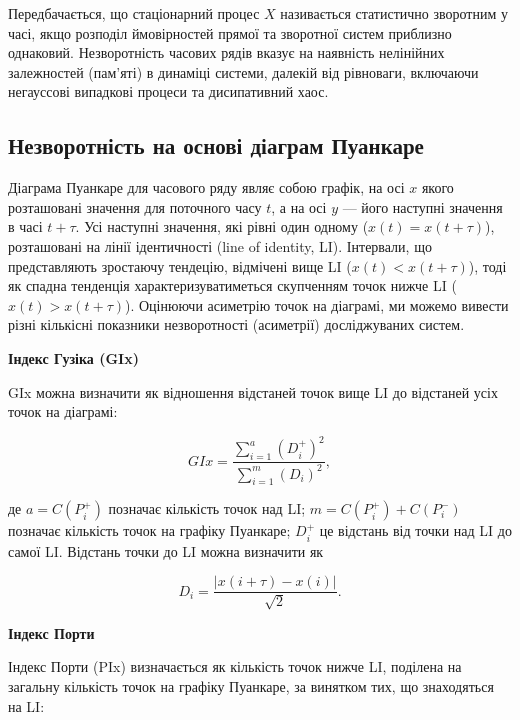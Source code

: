 \documentclass[
  letterpaper,
]{report}
\begin{document}
Передбачається, що стаціонарний процес \(X\) називається статистично
зворотним у часі, якщо розподіл ймовірностей прямої та зворотної систем
приблизно однаковий. Незворотність часових рядів вказує на наявність
нелінійних залежностей (пам'яті) в динаміці системи, далекій від
рівноваги, включаючи негауссові випадкові процеси та дисипативний хаос.

\hypertarget{ux43dux435ux437ux432ux43eux440ux43eux442ux43dux456ux441ux442ux44c-ux43dux430-ux43eux441ux43dux43eux432ux456-ux434ux456ux430ux433ux440ux430ux43c-ux43fux443ux430ux43dux43aux430ux440ux435}{%
\subsection{Незворотність на основі діаграм
Пуанкаре}\label{ux43dux435ux437ux432ux43eux440ux43eux442ux43dux456ux441ux442ux44c-ux43dux430-ux43eux441ux43dux43eux432ux456-ux434ux456ux430ux433ux440ux430ux43c-ux43fux443ux430ux43dux43aux430ux440ux435}}

Діаграма Пуанкаре для часового ряду являє собою графік, на осі \(x\)
якого розташовані значення для поточного часу \(t\), а на осі \(y\) ---
його наступні значення в часі \(t+\tau\). Усі наступні значення, які
рівні один одному (\(x(t) = x(t+\tau)\)), розташовані на лінії
ідентичності (line of identity, LI). Інтервали, що представляють
зростаючу тендецію, відмічені вище LI (\(x(t)<x(t+\tau)\)), тоді як
спадна тенденція характеризуватиметься скупченням точок нижче LI
(\(x(t)>x(t+\tau)\)). Оцінюючи асиметрію точок на діаграмі, ми можемо
вивести різні кількісні показники незворотності (асиметрії)
досліджуваних систем.

\textbf{Індекс Гузіка (GIx)}

GIx можна визначити як відношення відстаней точок вище LI до відстаней
усіх точок на діаграмі:

\[ 
GIx = \frac{\sum_{i=1}^{a} \left( D_{i}^{+} \right)^{2}}{\sum_{i=1}^{m} \left( D_{i} \right)^{2} }, 
\]

де \(a = C(P_{i}^{+})\) позначає кількість точок над LI;
\(m = C(P_{i}^{+}) + C(P_{i}^{-})\) позначає кількість точок на графіку
Пуанкаре; \(D_{i}^{+}\) це відстань від точки над LI до самої LI.
Відстань точки до LI можна визначити як

\[ 
D_{i} = \frac{|x(i+\tau) - x(i)|}{\sqrt{2}}. 
\]

\textbf{Індекс Порти}

Індекс Порти (PIx) визначається як кількість точок нижче LI, поділена на
загальну кількість точок на графіку Пуанкаре, за винятком тих, що
знаходяться на LI:
\end{document}
